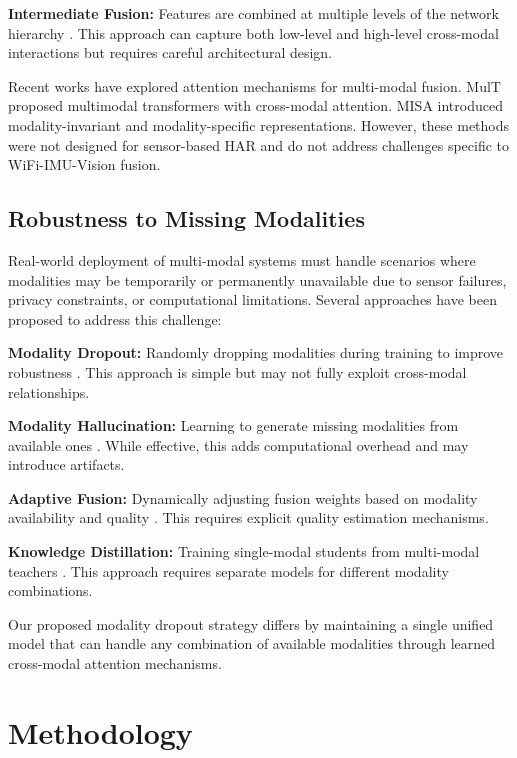 \documentclass[10pt,twocolumn]{article}
\begin{document}
\textbf{Intermediate Fusion:} Features are combined at multiple levels of the network hierarchy \cite{liu2018intermediate}. This approach can capture both low-level and high-level cross-modal interactions but requires careful architectural design.

Recent works have explored attention mechanisms for multi-modal fusion. MulT \cite{tsai2019multimodal} proposed multimodal transformers with cross-modal attention. MISA \cite{hazarika2020misa} introduced modality-invariant and modality-specific representations. However, these methods were not designed for sensor-based HAR and do not address challenges specific to WiFi-IMU-Vision fusion.

\subsection{Robustness to Missing Modalities}

Real-world deployment of multi-modal systems must handle scenarios where modalities may be temporarily or permanently unavailable due to sensor failures, privacy constraints, or computational limitations. Several approaches have been proposed to address this challenge:

\textbf{Modality Dropout:} Randomly dropping modalities during training to improve robustness \cite{neverova2015moddrop}. This approach is simple but may not fully exploit cross-modal relationships.

\textbf{Modality Hallucination:} Learning to generate missing modalities from available ones \cite{garcia2018modality}. While effective, this adds computational overhead and may introduce artifacts.

\textbf{Adaptive Fusion:} Dynamically adjusting fusion weights based on modality availability and quality \cite{vielzeuf2018adaptive}. This requires explicit quality estimation mechanisms.

\textbf{Knowledge Distillation:} Training single-modal students from multi-modal teachers \cite{gupta2016cross}. This approach requires separate models for different modality combinations.

Our proposed modality dropout strategy differs by maintaining a single unified model that can handle any combination of available modalities through learned cross-modal attention mechanisms.

\section{Methodology}
\end{document}
